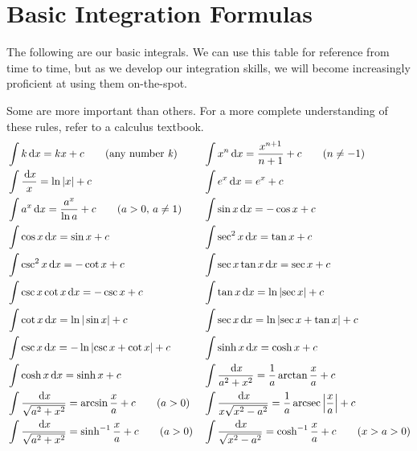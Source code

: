 \section{Basic Integration Formulas}
\label{sec:basicints}
The following are our basic integrals.
We can use this table for reference from time to time,
but as we develop our integration skills, we will become increasingly proficient at using them on-the-spot.

Some are more important than others. For a more complete understanding of these rules, refer to a calculus textbook.
\begin{align*}
  &\int k\,\mathrm{d} x=kx+c \qquad \text{(any number \emph{k})}
  &&\int x^n\,\mathrm{d} x = \frac {x^{n+1}}{n+1}+c\qquad (n \neq -1) \\
  &\int \frac{\,\mathrm{d} x}{x}=\ln{|x|}+c
  &&\int e^x \,\mathrm{d} x=e^x+c \\
  &\int a^x \,\mathrm{d} x=\frac{a^x}{\ln a}+c \qquad (a>0,\, a\neq 1)
  &&\int \sin x \,\mathrm{d} x=-\cos x +c \\
  &\int \cos x \,\mathrm{d} x=\sin x+c
  &&\int \sec^2x \,\mathrm{d} x = \tan x +c \\
  &\int \csc^2 x \,\mathrm{d} x = -\cot x +c
  &&\int \sec x \tan x \,\mathrm{d} x = \sec x +c \\
  &\int \csc x \cot x \,\mathrm{d} x = -\csc x +c
  &&\int \tan x \,\mathrm{d} x =\ln {\left|\sec x\right|} +c \\
  &\int \cot x \,\mathrm{d} x=\ln{|\sin x|}+c
  &&\int \sec x \,\mathrm{d} x = \ln{\left|\sec x + \tan x\right|} +c \\
  &\int \csc x \,\mathrm{d} x = -\ln{\left|\csc x + \cot x\right|}+c
  &&\int \sinh x \,\mathrm{d} x=\cosh x+c \\
  &\int \cosh x \,\mathrm{d} x=\sinh x+c
  &&\int \frac{\,\mathrm{d} x}{a^2+x^2}=\frac{1}{a}\arctan{\frac{x}{a}}+c \\
  &\int \frac{\,\mathrm{d} x}{\sqrt{a^2+x^2}}=\arcsin{\frac{x}{a}+c} \qquad (a > 0)
  &&\int \frac{\,\mathrm{d} x}{x\sqrt{x^2-a^2}}=\frac{1}{a}\operatorname{arcsec}{\left|\frac{x}{a}\right|}+c \\
  & \int\frac{\,\mathrm{d} x}{\sqrt{a^2+x^2}}=\sinh^{-1}{\frac{x}{a}}+c \qquad (a>0)
  && \int\frac{\,\mathrm{d} x}{\sqrt{x^2-a^2}}=\cosh^{-1}{\frac{x}{a}}+c \qquad (x>a>0)
\end{align*}
\cite[p. 435]{thomas}
%
